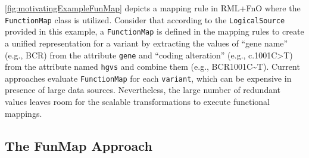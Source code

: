 \autoref{fig:motivatingExampleFunMap} depicts a mapping rule in  RML+FnO where the \verb|FunctionMap| class is utilized. Consider that according to the \verb|LogicalSource| provided in this example, a \verb|FunctionMap| is defined in the mapping rules to create a unified representation for a variant by extracting the values of ``gene name'' (e.g., BCR) from the attribute \verb|gene| and 
``coding alteration'' (e.g., c.1001C\textgreater T)  from the attribute named \verb|hgvs| and combine them (e.g., BCR\textunderscore1001C\textasciitilde T). Current approaches evaluate \verb|FunctionMap| for each \verb|variant|, which can be expensive in presence of large data sources. Nevertheless, the large number of redundant values leaves room for the scalable transformations to execute functional mappings. 


\subsection{The FunMap Approach}

